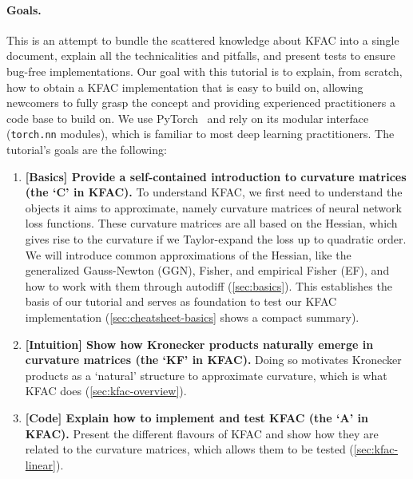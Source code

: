 \paragraph{Goals.}
This is an attempt to bundle the scattered knowledge about KFAC into a single document, explain all the technicalities and pitfalls, and present tests to ensure bug-free implementations.
Our goal with this tutorial is to explain, from scratch, how to obtain a KFAC implementation that is easy to build on, allowing newcomers to fully grasp the concept and providing experienced practitioners a code base to build on.
We use PyTorch~\cite{paszke2019pytorch} and rely on its modular interface (\texttt{torch.nn} modules), which is familiar to most deep learning practitioners.
The tutorial's goals are the following:
\begin{enumerate}
\item \textbf{[Basics] Provide a self-contained introduction to curvature matrices (the `C' in KFAC).}
  To understand KFAC, we first need to understand the objects it aims to approximate, namely curvature matrices of neural network loss functions.
  These curvature matrices are all based on the Hessian, which gives rise to the curvature if we Taylor-expand the loss up to quadratic order.
  We will introduce common approximations of the Hessian, like the generalized Gauss-Newton (GGN), Fisher, and empirical Fisher (EF), and how to work with them through autodiff (\cref{sec:basics}).
  This establishes the basis of our tutorial and serves as foundation to test our KFAC implementation (\cref{sec:cheatsheet-basics} shows a compact summary).

\item \textbf{[Intuition] Show how Kronecker products naturally emerge in curvature matrices (the `KF' in KFAC).}
  Doing so motivates Kronecker products as a `natural' structure to approximate curvature, which is what KFAC does (\cref{sec:kfac-overview}).

\item \textbf{[Code] Explain how to implement and test KFAC (the `A' in KFAC).}
  Present the different flavours of KFAC and show how they are related to the curvature matrices, which allows them to be tested (\cref{sec:kfac-linear}).
\end{enumerate}
